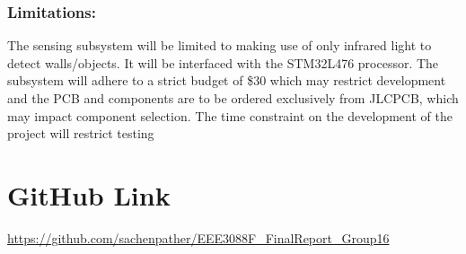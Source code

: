 \documentclass[class=report,11pt,crop=false]{standalone}
\begin{document}
 \subsubsection{Limitations:}
The sensing subsystem will be limited to making use of only infrared light to detect walls/objects. It will be interfaced with the STM32L476 processor. The subsystem will adhere to a strict budget of \$30 which may restrict development and the PCB and components are to be ordered exclusively from JLCPCB, which may impact component selection. The time constraint on the development of the project will restrict testing 

\section{GitHub Link}
\url{https://github.com/sachenpather/EEE3088F_FinalReport_Group16}
\ifstandalone

\fi
\end{document}

